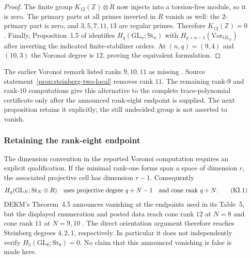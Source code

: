 \documentclass[11pt,a4paper]{article}
\theoremstyle{definition}
\begin{document}
\begin{proof}
The finite group $K_{12}(\mathbb Z)\otimes R$ now injects into a
torsion-free module, so it is zero. The primary parts at all primes
inverted in $R$ vanish as well: the $2$-primary part is zero, and
$3,5,7,11,13$ are regular primes. Therefore $K_{12}(\mathbb Z)=0$.
Finally, Proposition~1.5 of \cite{DEKM2026} identifies
$H_q(\mathrm{GL}_n;\mathrm{St}_n)$ with
$H_{q+n-1}(\mathrm{Vor}_{\mathrm{GL}_n})$ after inverting the
indicated finite-stabilizer orders. At $(n,q)=(9,4)$ and $(10,3)$
the Voronoi degree is $12$, proving the equivalent formulation.
\end{proof}

The earlier Voronoi remark listed ranks $9,10,11$ as missing
\cite[Remark~6.6, author-preprint p.~19]{DEKM2026}.
Source statement~\ref{prop:steinberg-two-local} removes rank $11$.
The remaining rank-$9$ and rank-$10$ computations give this alternative
to the complete trace-polynomial certificate only after the announced
rank-eight endpoint is supplied. The next proposition retains it
explicitly; the still undecided group is not asserted to vanish.

\subsubsection{Retaining the rank-eight endpoint}
\label{sec:k12-index-safe}

The dimension convention in the reported Voronoi computation requires
an explicit qualification.  If the minimal rank-one forms span a space
of dimension $r$, the associated projective cell has dimension $r-1$.
Consequently
\[
 H_q(\mathrm{GL}_N;\mathrm{St}_N\otimes R)
 \quad\hbox{uses projective degree }q+N-1
 \quad\hbox{and cone rank }q+N.
 \tag{KI.1}
\]
DEKM's Theorem~4.5 announces vanishing at the endpoints used in its
Table~5, but the displayed enumeration and posted data reach cone rank
$12$ at $N=8$ and cone rank $11$ at $N=9,10$
\cite[\S\S1.1--1.2, Definition~2.1, Tables~3--4,
Theorem~4.5]{DEKM2026}.
The direct orientation argument therefore reaches Steinberg degrees
$4,2,1$, respectively.  In particular it does not independently verify
$H_5(\mathrm{GL}_8;\mathrm{St}_8)=0$.
No claim that this announced vanishing is false is made here.
\end{document}
